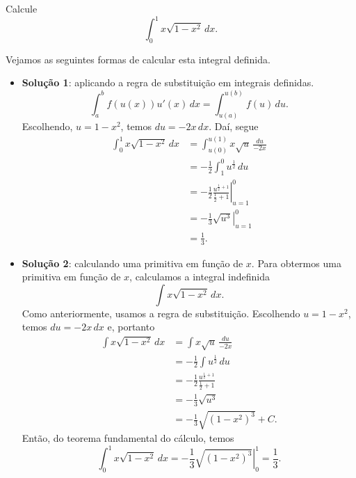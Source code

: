 \begin{exeresol}
  Calcule
  \begin{equation}
    \int_0^1x\sqrt{1-x^2}\,dx.
  \end{equation}
\end{exeresol}
\begin{resol}
  Vejamos as seguintes formas de calcular esta integral definida.
  \begin{itemize}
  \item {\bf Solução 1}: aplicando a regra de substituição em integrais definidas.
    \begin{equation}
      \int_a^bf(u(x))u'(x)\,dx = \int_{u(a)}^{u(b)} f(u)\,du.
    \end{equation}
    Escolhendo, $u = 1-x^2$, temos $du = -2x\,dx$. Daí, segue
    \begin{align}
      \int_0^1x\sqrt{1-x^2}\,dx &= \int_{u(0)}^{u(1)}x\sqrt{u}\,\frac{du}{-2x}\\
                                &= -\frac{1}{2}\int_{1}^0 u^{\frac{1}{2}}\,du\\
                                &= -\frac{1}{2}\left.\frac{u^{\frac{1}{2}+1}}{\frac{1}{2}+1}\right|_{u=1}^0\\
                                &= -\frac{1}{3}\left.\sqrt{u^3}\right|_{u=1}^0\\
                                &= \frac{1}{3}.
    \end{align}
  \item {\bf Solução 2}: calculando uma primitiva em função de $x$.
    Para obtermos uma primitiva em função de $x$, calculamos a integral indefinida
    \begin{equation}
      \int x\sqrt{1-x^2}\,dx.
    \end{equation}
    Como anteriormente, usamos a regra de substituição. Escolhendo $u=1-x^2$, temos $du = -2x\,dx$ e, portanto
    \begin{align}
      \int x\sqrt{1-x^2}\,dx &= \int x\sqrt{u}\,\frac{du}{-2x}\\
                             &= -\frac{1}{2}\int u^{\frac{1}{2}}\,du\\
                             &= -\frac{1}{2}\frac{u^{\frac{1}{2}+1}}{\frac{1}{2}+1}\\
                             &= -\frac{1}{3}\sqrt{u^3}\\
                             &= -\frac{1}{3}\sqrt{(1-x^2)^3} + C.
    \end{align}
    Então, do teorema fundamental do cálculo, temos
    \begin{equation}
      \int_0^1 x\sqrt{1-x^2}\,dx = -\frac{1}{3}\left.\sqrt{(1-x^2)^3}\right|_{0}^1 = \frac{1}{3}.
    \end{equation}
  \end{itemize}
\end{resol}


